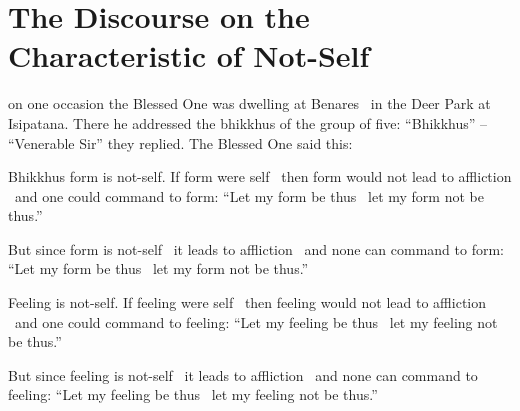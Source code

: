 \section{The Discourse on the Characteristic of Not-Self}
\label{characteristic-of-not-self}

\begin{english-only-hang}
\hyperlink{endnote107-appendix}{\hypertarget{endnote107-body}{}}
  on one occasion the Blessed One was dwelling at Benares \breathmark\ in the Deer Park at Isipatana. There he addressed the bhikkhus of the group of five: ``Bhikkhus'' – ``Venerable Sir'' they replied. The Blessed One said this:\hyperlink{endnote108-appendix}{\hypertarget{endnote108-body}{}}
\end{english-only-hang}

\begin{english-only-hang}
Bhikkhus form is not-self. If form were self \breathmark\ then form would not lead to affliction \breathmark\ and one could command to form: ``Let my form be thus \breathmark\ let my form not be thus.''
\end{english-only-hang}

\begin{english-only-hang}
But since form is not-self \breathmark\ it leads to affliction \breathmark\ and none can command to form: ``Let my form be thus \breathmark\ let my form not be thus.''
\end{english-only-hang}

\begin{english-only-hang}
Feeling is not-self. If feeling were self \breathmark\ then feeling would not lead to affliction \breathmark\ and one could command to feeling: ``Let my feeling be thus \breathmark\ let my feeling not be thus.''
\end{english-only-hang}

\begin{english-only-hang}
But since feeling is not-self \breathmark\ it leads to affliction \breathmark\ and none can command to feeling: ``Let my feeling be thus \breathmark\ let my feeling not be thus.''
\end{english-only-hang}

